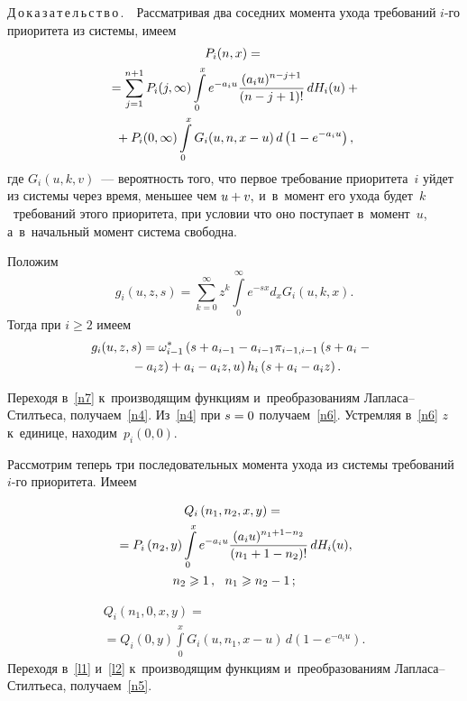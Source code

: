 \begin{multicols}{2}
\noindent
Д\,о\,к\,а\,з\,а\,т\,е\,л\,ь\,с\,т\,в\,о\,.\ \
Рассматривая два соседних момента ухода требований $i$-го приоритета из сис\-те\-мы, имеем
\begin{multline}
\label{n7}
P_i(n,x)={}\\
{}=\sum\limits_{j=1}^{n+1}P_i(j,\infty)
\int\limits_0^xe^{-a_iu}\displaystyle\frac{\displaystyle (a_iu)^{n-j+1}\mathstrut}{\displaystyle (n-j+1)!\mathstrut}\,dH_i(u)+{}\\
{}+P_i(0,\infty)\int\limits_0^xG_i(u,n,x-u)\,d\left(1-e^{-a_iu}\right),
\end{multline}
где $G_i(u,k,v)$~--- вероятность того, что первое требование приоритета~$i$ 
 уйдет из системы через время, меньшее чем $u\hm+v,$ и~в~момент его ухода будет~$k$~требований 
 этого приоритета, при условии что оно поступает в~момент~$u$, 
а~в~начальный момент система свободна.

Положим
$$
g_i(u,z,s)=\sum\limits_{k=0}^{\infty}z^k\int\limits_0^{\infty}e^{-sx}d_xG_i(u,k,x).
$$
Тогда  при $i\geqslant 2$ имеем
\begin{multline*}
\!\!g_i(u,z,s)=\omega_{i-1}^{*}\left(s+a_{i-1}-
a_{i-1}\pi_{i-1,i-1}
\left(s+a_i-{}\right.\right.\hspace*{-1.67781pt}\\
\left.\left.{}-a_iz\right)
+a_i-a_iz,u\right)h_i\left(s+a_i-a_iz\right).
\end{multline*}

Переходя в~\eqref{n7} к~производящим функциям и~преобразованиям Лап\-ла\-са--Стилть\-еса, получаем~\eqref{n4}. 
Из~\eqref{n4} при $s\hm=0$ получаем~\eqref{n6}.
Устремляя в~\eqref{n6}  $z$ к~единице, находим~$p_i(0,0).$

Рассмотрим теперь три последовательных момента ухода из системы требований
 $i$-го приоритета. Имеем
 
 \noindent
\begin{multline}
\label{l1}
Q_i\left(n_1,n_2,x,y\right)={}\\
{}=P_i\left(n_2,y
\right)\int\limits_0^xe^{-a_iu}\displaystyle\frac{\displaystyle (a_iu)^{n_1+1-n_2}\mathstrut}{\displaystyle (n_1+1-n_2)!\mathstrut}\,dH_i(u),\\ 
n_2\geqslant 1\,,\ \  n_1\geqslant n_2-1\,;
\end{multline}

\vspace*{-12pt}

\noindent
\begin{multline}
\label{l2}
Q_i\left(n_1,0,x,y\right)={}\\
{}=Q_i(0,y)\int\limits_0^xG_i\left(u,n_1,x-u\right)\,d\left(1-e^{-a_iu}\right).
\end{multline}
Переходя в~\eqref{l1} и~\eqref{l2} к~производящим функциям и~преобразованиям Лап\-ла\-са--Стилть\-еса, 
получаем~\eqref{n5}.




\end{multicols}
